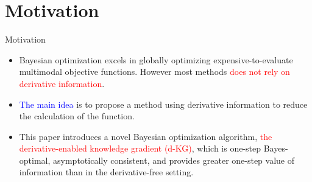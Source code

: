 \documentclass{beamer}
\begin{document}
\section{Motivation}
\begin{frame}{Motivation}
    \begin{itemize}
        \item Bayesian optimization excels in globally optimizing expensive-to-evaluate multimodal objective functions. However most methods \textcolor{red}{does not rely on derivative information}.
        \item \textcolor{blue}{The main idea} is to propose a method using derivative information to reduce the calculation of the function.
        \item This paper introduces a novel Bayesian optimization algorithm,  \textcolor{red}{the derivative-enabled knowledge gradient (d-KG)}, which is one-step Bayes-optimal, asymptotically consistent, and provides greater one-step value of information than in the derivative-free setting.
    \end{itemize}





\end{frame}
\end{document}
